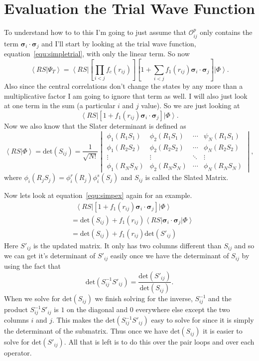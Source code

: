 \documentclass[12pt]{extarticle}
\newcommand{\Oopij}{\mathcal{O}^p_{ij}}
\newcommand{\ket}[1]{\left| #1 \right>}
\newcommand{\bra}[1]{\left< #1 \right|}
\newcommand{\braket}[2]{\left< #1 | #2 \right>}
\newcommand{\sigmai}{\bm{\sigma}_i}
\newcommand{\sigmaj}{\bm{\sigma}_j}
\newcommand{\sigmaij}{\sigmai \cdot \sigmaj}
\begin{document}
\section{Evaluation the Trial Wave Function}
To understand how to to this I'm going to just assume that $\Oopij$ only contains the term $\sigmaij$ and I'll start by looking at the trial wave function, equation~\ref{equ:simpletrial}, with only the linear term. So now
\begin{equation}
  \braket{RS}{\Psi_T} = \bra{RS} \left[ \prod_{i<j}f_c(r_{ij}) \right] \left[ 1+\sum_{i<j} f_1(r_{ij})\sigmaij \right] \ket{\Phi}.
\end{equation}
Also since the central correlations don't change the states by any more than a multiplicative factor I am going to ignore that term as well. I will also just look at one term in the sum (a particular $i$ and $j$ value). So we are just looking at
\begin{equation}
  \bra{RS} \left[ 1+f_1(r_{ij})\sigmaij \right] \ket{\Phi}.
  \label{equ:simpex}
\end{equation}
Now we also know that the Slater determinant is defined as
\begin{equation}
  \braket{RS}{\Phi} = \mathrm{det}(S_{ij}) = \frac{1}{\sqrt{N!}} \begin{vmatrix}
  \phi_1(R_1S_1) & \phi_2(R_1S_1) & \cdots & \psi_N(R_1S_1) \\ 
  \phi_1(R_2S_2) & \phi_2(R_2S_2) & \cdots & \phi_N(R_2S_2) \\
  \vdots & \vdots & \ddots &\vdots \\
  \phi_1(R_NS_N)& \phi_2(R_NS_N) & \cdots & \phi_N(R_NS_N) \end{vmatrix},
\end{equation}
where $\phi_i(R_jS_j)=\phi^r_i(R_j)\phi^s_i(S_j)$ and $S_{ij}$ is called the Slated Matrix.

Now lets look at equation~\ref{equ:simpex} again for an example.
\begin{align}
  & ~ ~ ~ \bra{RS} \left[ 1+f_1(r_{ij})\sigmaij \right] \ket{\Phi} \\
  &= \mathrm{det}(S_{ij}) + f_1(r_{ij}) \bra{RS}\sigmaij\ket{\Phi} \\
  &= \mathrm{det}(S_{ij}) + f_1(r_{ij})\mathrm{det}(S'_{ij})
\end{align}
Here $S'_{ij}$ is the updated matrix. It only has two columns different than $S_{ij}$ and so we can get it's determinant of $S'_{ij}$ easily once we have the determinant of $S_{ij}$ by using the fact that
\begin{equation}
  \mathrm{det}(S^{-1}_{ij} S'_{ij}) = \frac{\mathrm{det}(S'_{ij})}{\mathrm{det}(S_{ij})}.
\end{equation}
When we solve for $\mathrm{det}(S_{ij})$ we finish solving for the inverse, $S^{-1}_{ij}$ and the product $S^{-1}_{ij}S'_{ij}$ is $1$ on the diagonal and $0$ everywhere else except the two columns $i$ and $j$. This makes the $\mathrm{det}(S^{-1}_{ij}S'_{ij})$ easy to solve for since it is simply the determinant of the submatrix. Thus once we have $\mathrm{det}(S_{ij})$ it is easier to solve for $\mathrm{det}(S'_{ij})$. All that is left is to do this over the pair loops and over each operator.



\end{document}
